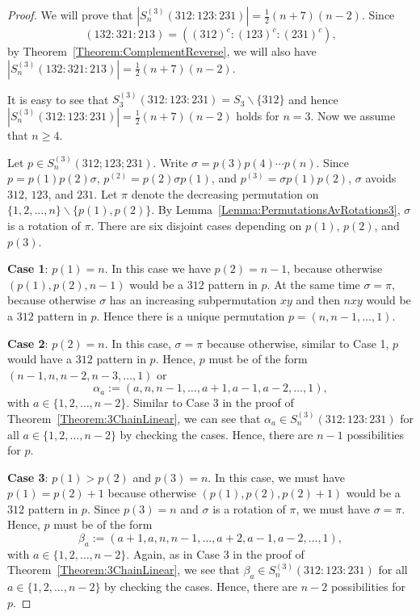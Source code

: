 \documentclass[10pt,a4paper]{amsart}
\newcommand{\half}{{\textstyle\frac12}}
\numberwithin{equation}{section}
\begin{document}
\begin{proof}
    We will prove that $|S_n^{(3)}(312:123:231)|=\half (n+7)(n-2)$. Since \[(132:321:213)=((312)^c:(123)^c:(231)^c),\] by 
Theorem~\ref{Theorem:ComplementReverse}, we will also have $|S_n^{(3)}(132:321:213)|=\half (n+7)(n-2)$. 
    
    It is easy to see that $S_3^{(3)}(312:123:231)=S_3\backslash\{312\}$ and hence $|S_n^{(3)}(312:123:231)|=\half (n+7)(n-2)$ holds for $n=3$. Now we assume that $n\geq4$.

    Let $p\in S_n^{(3)}(312;123;231)$. Write $\sigma=p(3)p(4)\cdots p(n)$. Since $p=p(1)p(2)\sigma$, $p^{(2)}=p(2)\sigma p(1)$, and $p^{(3)}=\sigma p(1)p(2)$, $\sigma$ avoids $312$, $123$, and $231$. Let $\pi$ denote the decreasing permutation on $\{1,2,\ldots,n\}\backslash\{p(1),p(2)\}$. By Lemma~\ref{Lemma:PermutationsAvRotations3}, $\sigma$ is a rotation of $\pi$.  There are six 
disjoint cases depending on $p(1)$, $p(2)$, and $p(3)$.

    {\bf Case 1}: $p(1)=n$. In this case we have $p(2)=n-1$, because otherwise $(p(1),p(2),n-1)$ would be a $312$ pattern in $p$. 
At the same time $\sigma=\pi$, because otherwise $\sigma$ has an increasing subpermutation $xy$ and then $nxy$ would be a $312$ pattern in $p$. Hence there is a unique permutation $p=(n,n-1,\ldots,1)$.

    {\bf Case 2}: $p(2)=n$. In this case, $\sigma=\pi$ because otherwise, similar to Case 1, $p$ would have a $312$ pattern in $p$. Hence, $p$ must be of the form $(n-1,n,n-2,n-3,\ldots,1)$ or \[\alpha_a:=(a,n,n-1,\ldots,a+1,a-1,a-2,\ldots,1),\] with $a\in\{1,2,\ldots,n-2\}$. Similar to Case 3 in the proof of Theorem~\ref{Theorem:3ChainLinear}, we can see that $\alpha_a\in S_n^{(3)}(312:123:231)$ for all $a\in\{1,2,\ldots,n-2\}$ by checking the cases. Hence, there are $n-1$ possibilities for $p$.

    {\bf Case 3}: $p(1)>p(2)$ and $p(3)=n$. In this case, we must have $p(1)=p(2)+1$ because otherwise $(p(1),p(2),p(2)+1)$ would be a $312$ pattern in $p$. Since $p(3)=n$ and $\sigma$ is a rotation of $\pi$, we must have $\sigma=\pi$. Hence, $p$ must be of the form
    \[
    \beta_a:=(a+1,a,n,n-1,\ldots,a+2,a-1,a-2,\ldots,1),
    \]
    with $a\in\{1,2,\ldots,n-2\}$. Again, as in Case 3 in the proof of Theorem~\ref{Theorem:3ChainLinear}, we see that $\beta_a\in S_n^{(3)}(312:123:231)$ for all $a\in\{1,2,\ldots,n-2\}$ by checking the cases. 
Hence, there are $n-2$ possibilities for $p$.


\end{proof}
\end{document}

